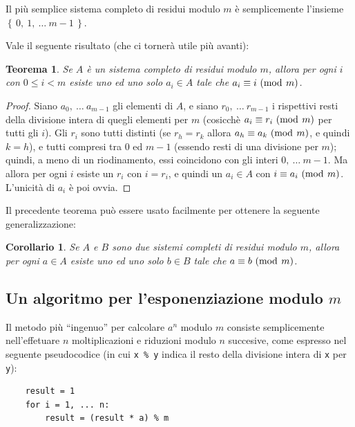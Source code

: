 \documentclass[pdflatex,11pt,a4paper,oneside]{article}
\newcommand{\congruent}[0]{\equiv}
\newcommand{\mmodop}[0]{\ensuremath{\operatorname{mod}}}
\newcommand{\mmod}[1]{\ensuremath{\allowbreak\ (\mmodop\:{#1})}}
\newcommand{\set}[1]{\ensuremath{\left\{\,{#1}\,\right\}}}
\newtheorem{theorem}[TheoremLike]{Teorema}
\newtheorem{corollary}[TheoremLike]{Corollario}
\begin{document}
Il pi\`u semplice sistema completo di residui modulo $m$ \`e semplicemente
l'insieme $\set{0,\: 1,\: \ldots\: m - 1}$.

\smallskip
Vale il seguente risultato (che ci torner\`a utile pi\`u avanti):
%
\begin{theorem}\label{thm:complete-residue-system}
Se $A$ \`e un sistema completo di residui modulo $m$, allora per ogni
$i$ con $0 \leq i < m$ esiste uno ed uno solo $a_i \in A$ tale che
$a_i \congruent i \mmod m$.
\end{theorem}
%
\begin{proof}
Siano $a_0,\: \ldots\: a_{m-1}$ gli elementi di $A$, e siano $r_0,\:
\ldots\: r_{m-1}$ i rispettivi resti della divisione intera di quegli
elementi per $m$ (cosicch\`e $a_i \congruent r_i \mmod m$ per tutti
gli $i$).  Gli $r_i$ sono tutti distinti (se $r_h = r_k$ allora
$a_h \congruent a_k \mmod m$, e quindi $k = h$), e tutti compresi tra
$0$ ed $m - 1$ (essendo resti di una divisione per $m$); quindi, a
meno di un riodinamento, essi coincidono con gli interi $0,\: \ldots\:
m -1$.  Ma allora per ogni $i$ esiste un $r_i$ con $i = r_i$, e quindi
un $a_i \in A$ con $i \congruent a_i \mmod m$. L'unicit\`a di $a_i$
\`e poi ovvia.
\end{proof}

Il precedente teorema pu\`o essere usato facilmente per ottenere la
seguente generalizzazione:
%
\begin{corollary}\label{cor:complete-residue-system-basic}
Se $A$ e $B$ sono due sistemi completi di residui modulo $m$, allora per
ogni $a \in A$ esiste uno ed uno solo $b \in B$ tale che $a \congruent b
\mmod m$.
\end{corollary}


\subsection{Un algoritmo per l'esponenziazione modulo $m$}

Il metodo pi\`u ``ingenuo'' per calcolare $a^n$ modulo $m$ consiste
semplicemente nell'effetuare $n$ moltiplicazioni e riduzioni modulo $n$
succesive, come espresso nel seguente pseudocodice (in cui \verb|x % y|
indica il resto della divisione intera di \verb|x| per \verb|y|):
%
\begin{verbatim}
    result = 1
    for i = 1, ... n:
        result = (result * a) % m
\end{verbatim}
\end{document}
